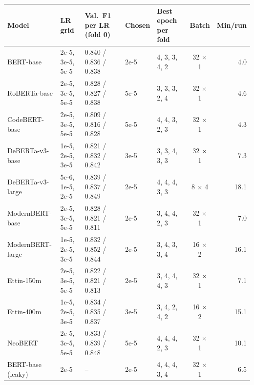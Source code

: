 \begin{tabular}{lllllcr}
\toprule
Model & LR grid & Val.\ F1 per LR (fold 0) & Chosen & Best epoch per fold & Batch & Min/run \\
\midrule
BERT-base & 2e-5, 3e-5, 5e-5 & 0.840 / 0.836 / 0.838 & 2e-5 & 4, 3, 3, 4, 2 & 32 $\times$ 1 & 4.0 \\
RoBERTa-base & 2e-5, 3e-5, 5e-5 & 0.828 / 0.827 / 0.838 & 5e-5 & 3, 3, 3, 2, 4 & 32 $\times$ 1 & 4.6 \\
CodeBERT-base & 2e-5, 3e-5, 5e-5 & 0.809 / 0.816 / 0.828 & 5e-5 & 4, 4, 3, 2, 3 & 32 $\times$ 1 & 4.3 \\
DeBERTa-v3-base & 1e-5, 2e-5, 3e-5 & 0.821 / 0.832 / 0.842 & 3e-5 & 3, 3, 4, 3, 3 & 32 $\times$ 1 & 7.3 \\
DeBERTa-v3-large & 5e-6, 1e-5, 2e-5 & 0.839 / 0.837 / 0.849 & 2e-5 & 4, 4, 4, 3, 3 & 8 $\times$ 4 & 18.1 \\
ModernBERT-base & 2e-5, 3e-5, 5e-5 & 0.828 / 0.821 / 0.811 & 2e-5 & 3, 4, 4, 2, 3 & 32 $\times$ 1 & 7.0 \\
ModernBERT-large & 1e-5, 2e-5, 3e-5 & 0.832 / 0.852 / 0.844 & 2e-5 & 3, 4, 3, 3, 4 & 16 $\times$ 2 & 16.1 \\
Ettin-150m & 2e-5, 3e-5, 5e-5 & 0.822 / 0.821 / 0.813 & 2e-5 & 3, 4, 4, 4, 3 & 32 $\times$ 1 & 7.1 \\
Ettin-400m & 1e-5, 2e-5, 3e-5 & 0.834 / 0.835 / 0.837 & 3e-5 & 3, 4, 2, 4, 2 & 16 $\times$ 2 & 15.1 \\
NeoBERT & 2e-5, 3e-5, 5e-5 & 0.833 / 0.839 / 0.848 & 5e-5 & 4, 4, 4, 2, 3 & 32 $\times$ 1 & 10.1 \\
BERT-base (leaky) & 2e-5 & -- & 2e-5 & 4, 4, 4, 3, 4 & 32 $\times$ 1 & 6.5 \\
\bottomrule
\end{tabular}
